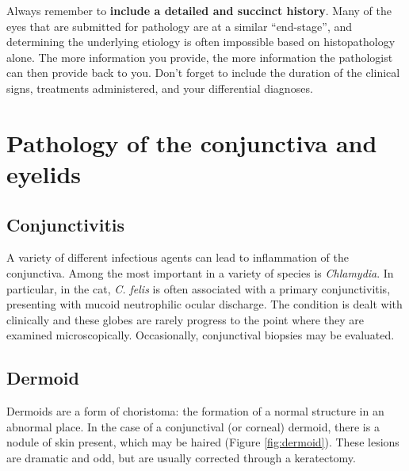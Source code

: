 \documentclass[
  openany]{article}
\begin{document}
Always remember to \textbf{include a detailed and succinct history}. Many of the eyes that are submitted for pathology are at a similar ``end-stage'', and determining the underlying etiology is often impossible based on histopathology alone. The more information you provide, the more information the pathologist can then provide back to you. Don't forget to include the duration of the clinical signs, treatments administered, and your differential diagnoses.

\hypertarget{pathology-of-the-conjunctiva-and-eyelids}{%
\section{Pathology of the conjunctiva and eyelids}\label{pathology-of-the-conjunctiva-and-eyelids}}

\hypertarget{conjunctivitis}{%
\subsection{Conjunctivitis}\label{conjunctivitis}}

A variety of different infectious agents can lead to inflammation of the conjunctiva. Among the most important in a variety of species is \emph{Chlamydia}. In particular, in the cat, \emph{C. felis} is often associated with a primary conjunctivitis, presenting with mucoid neutrophilic ocular discharge. The condition is dealt with clinically and these globes are rarely progress to the point where they are examined microscopically. Occasionally, conjunctival biopsies may be evaluated.

\hypertarget{dermoid}{%
\subsection{Dermoid}\label{dermoid}}

Dermoids are a form of choristoma: the formation of a normal structure in an abnormal place. In the case of a conjunctival (or corneal) dermoid, there is a nodule of skin present, which may be haired (Figure \ref{fig:dermoid}). These lesions are dramatic and odd, but are usually corrected through a keratectomy.
\end{document}
